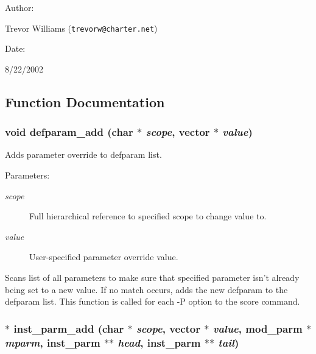\begin{Desc}
\item[Author: ]\par
Trevor Williams ({\tt trevorw@charter.net}) \end{Desc}
\begin{Desc}
\item[Date: ]\par
8/22/2002\end{Desc}


\subsection{Function Documentation}
\subsubsection{\setlength{\rightskip}{0pt plus 5cm}void defparam\_\-add (char $\ast$ {\em scope}, {\bf vector} $\ast$ {\em value})}\label{param_8h_a7}


Adds parameter override to defparam list.

\begin{Desc}
\item[Parameters: ]\par
\begin{description}
\item[{\em 
scope}]Full hierarchical reference to specified scope to change value to. \item[{\em 
value}]User-specified parameter override value.\end{description}
\end{Desc}
Scans list of all parameters to make sure that specified parameter isn't already being set to a new value. If no match occurs, adds the new defparam to the defparam list. This function is called for each -P option to the score command. 
\subsubsection{$\ast$ inst\_\-parm\_\-add (char $\ast$ {\em scope}, {\bf vector} $\ast$ {\em value}, {\bf mod\_\-parm} $\ast$ {\em mparm}, {\bf inst\_\-parm} $\ast$$\ast$ {\em head}, {\bf inst\_\-parm} $\ast$$\ast$ {\em tail})}\label{param_8h_a6}


